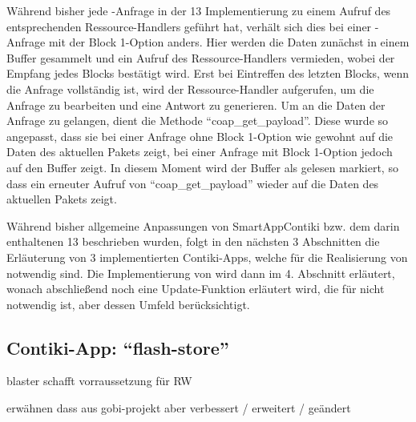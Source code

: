 Während bisher jede -Anfrage in der  13 Implementierung zu einem Aufruf des entsprechenden Ressource-Handlers geführt hat, verhält sich
dies bei einer -Anfrage mit der Block 1-Option anders. Hier werden die Daten zunächst in einem Buffer gesammelt und ein Aufruf des Ressource-Handlers
vermieden, wobei der Empfang jedes Blocks bestätigt wird. Erst bei Eintreffen des letzten Blocks, wenn die Anfrage vollständig ist, wird der Ressource-Handler
aufgerufen, um die Anfrage zu bearbeiten und eine Antwort zu generieren. Um an die Daten der Anfrage zu gelangen, dient die Methode "`coap\_get\_payload"'.
Diese wurde so angepasst, dass sie bei einer Anfrage ohne Block 1-Option wie gewohnt auf die Daten des aktuellen Pakets zeigt, bei einer Anfrage mit Block 1-Option
jedoch auf den Buffer zeigt. In diesem Moment wird der Buffer als gelesen markiert, so dass ein erneuter Aufruf von "`coap\_get\_payload"' wieder auf die Daten
des aktuellen Pakets zeigt.

Während bisher allgemeine Anpassungen von SmartAppContiki bzw. dem darin enthaltenen  13 beschrieben wurden, folgt in den nächsten 3 Abschnitten
die Erläuterung von 3 implementierten Contiki-Apps, welche für die Realisierung von  notwendig sind. Die Implementierung von  wird dann
im 4. Abschnitt erläutert, wonach abschließend noch eine Update-Funktion erläutert wird, die für  nicht notwendig ist, aber dessen Umfeld berücksichtigt.

\subsection{Contiki-App: "`flash-store"'}

blaster schafft vorraussetzung für RW

erwähnen dass aus gobi-projekt aber verbessert / erweitert / geändert

